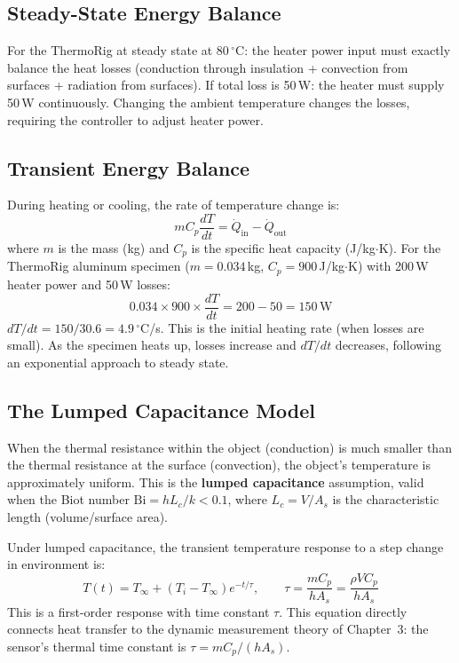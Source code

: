 \documentclass[11pt,letterpaper,twoside,openany]{book}
\newcommand{\degC}{\ensuremath{{}^{\circ}\text{C}}}
\begin{document}
\subsection{Steady-State Energy Balance}
For the ThermoRig at steady state at 80\,\degC{}: the heater power input must exactly balance the heat losses (conduction through insulation + convection from surfaces + radiation from surfaces). If total loss is 50\,W: the heater must supply 50\,W continuously. Changing the ambient temperature changes the losses, requiring the controller to adjust heater power.

\subsection{Transient Energy Balance}
During heating or cooling, the rate of temperature change is:
\begin{equation}
mC_p\frac{dT}{dt} = \dot{Q}_{\text{in}} - \dot{Q}_{\text{out}}
\end{equation}
where $m$ is the mass (kg) and $C_p$ is the specific heat capacity (J/kg$\cdot$K). For the ThermoRig aluminum specimen ($m = 0.034$\,kg, $C_p = 900$\,J/kg$\cdot$K) with 200\,W heater power and 50\,W losses:
\begin{equation}
0.034 \times 900 \times \frac{dT}{dt} = 200 - 50 = 150\,\text{W}
\end{equation}
$dT/dt = 150/30.6 = 4.9$\,\degC{}/s. This is the initial heating rate (when losses are small). As the specimen heats up, losses increase and $dT/dt$ decreases, following an exponential approach to steady state.

\subsection{The Lumped Capacitance Model}
When the thermal resistance within the object (conduction) is much smaller than the thermal resistance at the surface (convection), the object's temperature is approximately uniform. This is the \textbf{lumped capacitance} assumption, valid when the Biot number $\text{Bi} = hL_c/k < 0.1$, where $L_c = V/A_s$ is the characteristic length (volume/surface area).

Under lumped capacitance, the transient temperature response to a step change in environment is:
\begin{equation}
T(t) = T_\infty + (T_i - T_\infty)e^{-t/\tau}, \qquad \tau = \frac{mC_p}{hA_s} = \frac{\rho V C_p}{hA_s}
\end{equation}
This is a first-order response with time constant $\tau$. This equation directly connects heat transfer to the dynamic measurement theory of Chapter~3: the sensor's thermal time constant is $\tau = mC_p/(hA_s)$.
\end{document}
